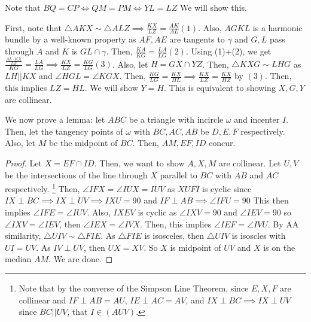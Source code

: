 \documentclass[11pt]{article}
\begin{document}

\begin{sol} Note that $BQ=CP \iff QM = PM \iff YL = LZ$ We will show this.

First, note that $\triangle AKX \sim \triangle ALZ\implies \frac{KX}{LZ} = \frac{AK}{AL} (1)$. Also, $AGKL$ is a harmonic bundle by a well-known property as $AF, AE$ are tangents to $\gamma$ and $G,L$ pass through $A$ and $K$ is $GL \cap \gamma$. Then, $\frac{KA}{KG} = \frac{LA}{LG}(2)$. Using (1)+(2), we get $\frac{\frac{AL\cdot KX}{LZ}}{KG} = \frac{LA}{LG} \implies \frac{KX}{LZ} = \frac{KG}{LG}(3)$. Also, let $H=GX \cap YZ$. Then, $\triangle KXG \sim LHG$ as $LH||KX$ and $\angle HGL = \angle KGX$. Then, $\frac{KG}{LG}=\frac{KX}{HL} \implies \frac{KX}{LZ } = \frac{KX}{HZ}$ by $(3)$. Then, this implies $LZ=HL$. We will show $Y=H$. This is equivalent to showing $X,G,Y$ are collinear.

We now prove a lemma: let $ABC$ be a triangle with incircle $\omega$ and incenter $I$. Then, let the tangency points of $\omega$ with $BC,AC,AB$ be $D,E,F$ respectively. Also, let $M$ be the midpoint of $BC$. Then, $AM, EF, ID$ concur.

\begin{proof}
Let $X=EF \cap ID$. Then, we want to show $A,X,M$ are collinear. Let $U,V$ be the intersections of the line through $X$ parallel to $BC$ with $AB$ and $AC$ respectively. \footnote{Note that by the converse of the Simpson Line Theorem, since $E,X,F$ are collinear and $IF \perp AB = AU$, $IE \perp AC = AV $, and $IX\perp BC\implies IX\perp UV$ since $BC||UV$, that $I\in (AUV)$.} Then, $\angle IFX = \angle IUX = IUV$ as $XUFI$ is cyclic since $IX\perp BC\implies IX\perp UV\implies IXU = 90$ and $IF\perp AB\implies \angle IFU =90$ This then implies $\angle IFE = \angle IUV$. Also, $IXEV$ is cyclic as $\angle IXV=90$ and $\angle IEV=90$ so $\angle IXV= \angle IEV$, then $\angle IEX=\angle IVX$. Then, this implies $\angle IEF = \angle IVU$. By AA similarity, $\triangle UIV \sim \triangle FIE$. As $\triangle FIE$ is isosceles, then $\triangle UIV$ is isoscles with $UI=UV$. As $IV \perp UV$, then $UX=XV$. So $X$ is midpoint of $UV$ and $X$ is on the median $AM$. We are done.
\end{proof}


\end{sol}
\end{document}
